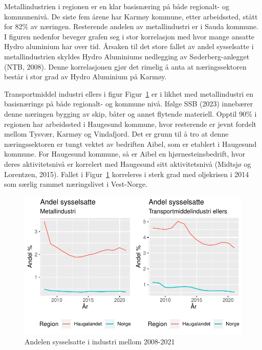 \documentclass[
]{article}
\begin{document}
Metallindustrien i regionen er en klar basisnæring på både regionalt- og
kommunenivå. De siste fem årene har Karmøy kommune, etter arbeidssted,
stått for 82\% av næringen. Resterende andelen av metallindustri er i
Sauda kommune. I figuren nedenfor beveger grafen seg i stor korrelasjon
med hvor mange ansatte Hydro aluminium har over tid. Årsaken til det
store fallet av andel sysselsatte i metallindustrien skyldes Hydro
Aluminiums nedlegging av Søderberg-anlegget (NTB, 2008). Denne
korrelasjonen gjør det rimelig å anta at næringssektoren består i stor
grad av Hydro Aluminium på Karmøy.

Transportmiddel industri ellers i figur Figur~\ref{fig-industri} er i
likhet med metallindustri en basisnærings på både regionalt- og kommune
nivå. Ifølge SSB (2023) innebærer denne næringen bygging av skip, båter
og annet flytende materiell. Opptil 90\% i regionen har arbeidssted i
Haugesund kommune, hvor resterende er jevnt fordelt mellom Tysvær,
Karmøy og Vindafjord. Det er grunn til å tro at denne næringssektoren er
tungt vektet av bedriften Aibel, som er etablert i Haugesund kommune.
For Haugesund kommune, så er Aibel en hjørnesteinsbedrift, hvor deres
aktivitetsnivå er korrelert med Haugesund sitt aktivitetsnivå (Midtsjø
og Lorentzen, 2015). Fallet i Figur~\ref{fig-industri} korreleres i
sterk grad med oljekrisen i 2014 som særlig rammet næringslivet i
Vest-Norge.

\begin{figure}[H]

{\centering \includegraphics{Masteroppgave_files/figure-pdf/fig-industri-1.pdf}

}

\caption{\label{fig-industri}Andelen sysselsatte i industri mellom
2008-2021}

\end{figure}
\end{document}
